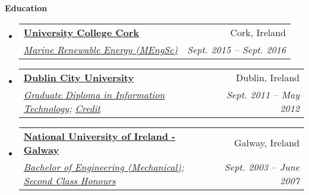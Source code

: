 \documentclass[letterpaper,11pt]{article}
\makeatletter
\newcommand{\resheading}[1]{{\large \colorbox{mygrey}{\begin{minipage}{\textwidth}{\textbf{#1 \vphantom{p\^{E}}}}\end{minipage}}}}
\newcommand{\ressubheading}[4]{
\begin{tabular*}{6.5in}{l@{\extracolsep{\fill}}r}
		\textbf{#1} & #2 \\
		\textit{#3} & \textit{#4} \\
\end{tabular*}\vspace{-6pt}}
\makeatother
\begin{document}
\resheading{Education}
  \begin{itemize}
    \item
      \ressubheading{\href{http://www.ucc.ie}{University College Cork}}{Cork, Ireland}{\href{http://www.ucc.ie/en/ckr51/}{Marine Renewable Energy (MEngSc)}}
      {Sept. 2015 -- Sept. 2016}
        

    \item
      \ressubheading{\href{http://www.dcu.ie}{Dublin City University}}{Dublin, Ireland}{\href{https://www.dcu.ie/prospective/deginfo.php?classname=GDF\&originating_school=40}{Graduate Diploma in Information Technology};
      \href{http://peterarmstrong.ie/cv/grad_dip_it_transcript.pdf}{Credit}}
      {Sept. 2011 -- May 2012}
        

    \item
      \ressubheading{\href{http://www.nuigalway.ie}{National University of Ireland - Galway}}{Galway, Ireland}
      {\href{http://www.nuigalway.ie/courses/undergraduate-courses/mechanical-engineering.html}{Bachelor of Engineering (Mechanical)}; 
      \href{http://peterarmstrong.ie/portfolio/mech_eng_transcript.jpg}{Second Class Honours}}
      {Sept. 2003 -- June 2007}
        \end{itemize}
        
\end{document}
